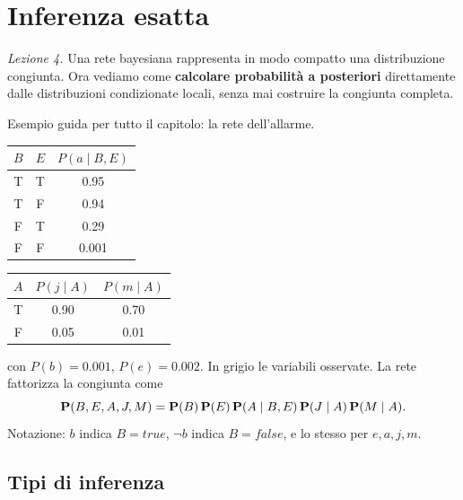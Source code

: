 
\chapter{Inferenza esatta}

\textit{Lezione 4.} Una rete bayesiana rappresenta in modo compatto una
distribuzione congiunta. Ora vediamo come \textbf{calcolare probabilità a
posteriori} direttamente dalle distribuzioni condizionate locali, senza mai
costruire la congiunta completa.

Esempio guida per tutto il capitolo: la rete dell'allarme.

\begin{center}
\qquad
\small
\begin{tabular}[b]{cc|c}
  $B$ & $E$ & $P(a\mid B,E)$ \\ \midrule
  T & T & 0.95 \\ T & F & 0.94 \\ F & T & 0.29 \\ F & F & 0.001
\end{tabular}\quad
\begin{tabular}[b]{c|cc}
  $A$ & $P(j\mid A)$ & $P(m\mid A)$ \\ \midrule
  T & 0.90 & 0.70 \\ F & 0.05 & 0.01
\end{tabular}
\end{center}
con $P(b)=0.001$, $P(e)=0.002$. In grigio le variabili osservate. La rete
fattorizza la congiunta come
\[
  \mathbf{P}(B,E,A,J,M) = \mathbf{P}(B)\,\mathbf{P}(E)\,\mathbf{P}(A\mid B,E)\,\mathbf{P}(J\mid A)\,\mathbf{P}(M\mid A).
\]
Notazione: $b$ indica $B=\mathit{true}$, $\neg b$ indica $B=\mathit{false}$, e
lo stesso per $e,a,j,m$.

\section{Tipi di inferenza}

